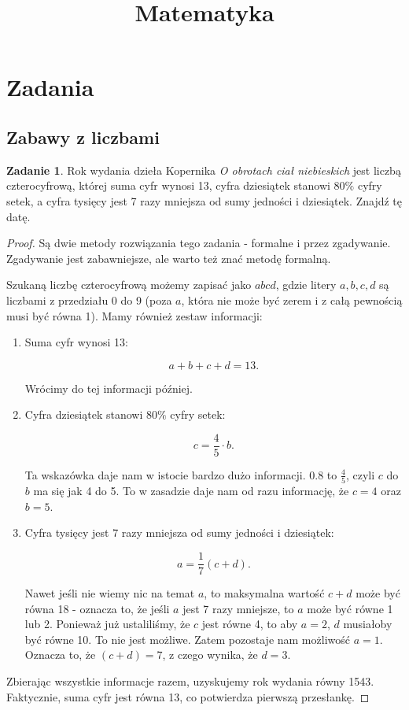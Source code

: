 \documentclass[11pt]{article}
\title{Matematyka}
\theoremstyle{definition}
\newtheorem{zad}{Zadanie}
\numberwithin{zad}{section}
\begin{document}
\maketitle
\tableofcontents


\section{Zadania}
\subsection{Zabawy z liczbami}

\begin{zad}
Rok wydania dzieła Kopernika \textit{O obrotach ciał niebieskich} jest liczbą czterocyfrową, której suma cyfr wynosi 13, cyfra dziesiątek stanowi $80\%$ cyfry setek, a cyfra tysięcy jest 7 razy mniejsza od sumy jedności i dziesiątek. Znajdź tę datę.
\end{zad}

\begin{proof}
Są dwie metody rozwiązania tego zadania - formalne i przez zgadywanie. Zgadywanie jest zabawniejsze, ale warto też znać metodę formalną.

Szukaną liczbę czterocyfrową możemy zapisać jako $abcd$, gdzie litery $a,b,c,d$ są liczbami z przedziału 0 do 9 (poza $a$, która nie może być zerem i z całą pewnością musi być równa 1). Mamy również zestaw informacji:

\begin{enumerate}
\item Suma cyfr wynosi 13:

$$a+b+c+d = 13.$$

Wrócimy do tej informacji później.
\item Cyfra dziesiątek stanowi $80\%$ cyfry setek:

$$c = \frac45 \cdot b.$$

Ta wskazówka daje nam w istocie bardzo dużo informacji. $0.8$ to $\frac 45$, czyli $c$ do $b$ ma się jak 4 do 5. To w zasadzie daje nam od razu informację, że $c = 4$ oraz $b = 5$.

\item Cyfra tysięcy jest 7 razy mniejsza od sumy jedności i dziesiątek:

$$a = \frac17 (c+d).$$

Nawet jeśli nie wiemy nic na temat $a$, to maksymalna wartość $c+d$ może być równa 18 - oznacza to, że jeśli $a$ jest 7 razy mniejsze, to $a$ może być równe 1 lub 2. Ponieważ już ustaliliśmy, że $c$ jest równe 4, to aby $a=2$, $d$ musiałoby być równe 10. To nie jest możliwe. Zatem pozostaje nam możliwość $a = 1$. Oznacza to, że $(c+d) = 7$, z czego wynika, że $d = 3$.
\end{enumerate}
Zbierając wszystkie informacje razem, uzyskujemy rok wydania równy 1543. Faktycznie, suma cyfr jest równa 13, co potwierdza pierwszą przesłankę.
\end{proof}
\end{document}
